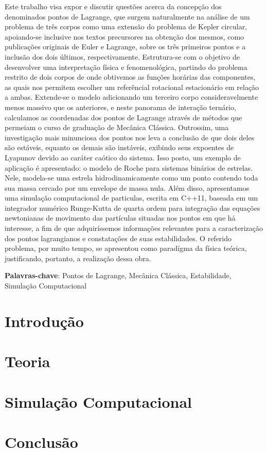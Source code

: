 \documentclass[10pt,twoside,a4paper,brazil]{abntex2}
\begin{document}
   \imprimircapa
   
   \imprimirfolhaderosto   
   
   \tableofcontents

	 \newpage
	 
   \begin{resumo}
      Este trabalho visa expor e discutir questões acerca da concepção dos denominados pontos de Lagrange, que surgem naturalmente na análise de um problema de três corpos como uma extensão do problema de Kepler circular, apoiando-se inclusive nos textos precursores na obtenção dos mesmos, como publicações originais de Euler e Lagrange, sobre os três primeiros pontos e a inclusão dos dois últimos, respectivamente. Estrutura-se com o objetivo de desenvolver uma interpretação física e fenomenológica, partindo do problema restrito de dois corpos de onde obtivemos as funções horárias das componentes, as quais nos permitem escolher um referêncial rotacional estacionário em relação a ambas. Extende-se o modelo adicionando um terceiro corpo consideravelmente menos massivo que os anteriores, e neste panorama de interação ternário, calculamos as coordenadas dos pontos de Lagrange através de métodos que permeiam o curso de graduação de Mecânica Clássica. Outrossim, uma investigação mais minunciosa dos pontos nos leva a conclusão de que dois deles são estáveis, equanto os demais são instáveis, exibindo seus expoentes de Lyapunov devido ao caráter caótico do sistema. Isso posto, um exemplo de aplicação é apresentado: o modelo de Roche para sistemas binários de estrelas. Nele, modela-se uma estrela hidrodinamicamente como um ponto contendo toda sua massa cercado por um envelope de massa nula. Além disso, apresentamos uma simulação computacional de particulas, escrita em C++11, baseada em um integrador numérico Runge-Kutta de quarta ordem para integração das equações newtonianas de movimento das partículas situadas nos pontos em que há interesse, a fim de que adquiríssemos informações relevantes para a caracterização dos pontos lagrangianos e constatações de suas estabilidades. O referido problema, por muito tempo, se apresentou como paradígma da física teórica, justificando, portanto, a realização dessa obra.

      \vspace{\onelineskip}
      \noindent
      \textbf{Palavras-chave}: Pontos de Lagrange, Mecânica Clássica, Estabilidade, Simulação Computacional
   \end{resumo}

   \chapter{Introdução}
      
      
   \chapter{Teoria}
      
     
   \chapter{Simulação Computacional}
      

   \chapter{Conclusão}
      

	 \nocite{mccann}\nocite{cornish}
   
\end{document}
